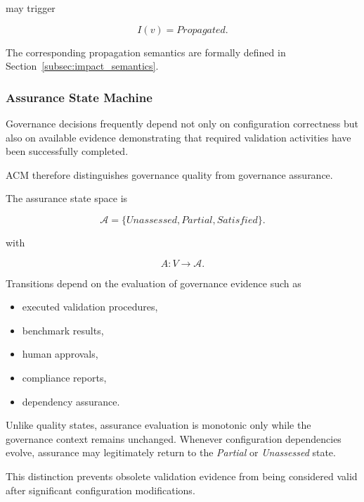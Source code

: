 \documentclass[10pt]{article}
\begin{document}
may trigger

\begin{equation}
I(v)=Propagated.
\label{eq:uv_propagation}
\end{equation}

The corresponding propagation semantics are formally defined in
Section~\ref{subsec:impact_semantics}.

\subsubsection{Assurance State Machine}

Governance decisions frequently depend not only on configuration correctness
but also on available evidence demonstrating that required validation
activities have been successfully completed.

ACM therefore distinguishes governance quality from governance assurance.

The assurance state space is

\begin{equation}
\mathcal{A}
=
\{
Unassessed,
Partial,
Satisfied
\}.
\label{eq:assurance_state}
\end{equation}

with

\begin{equation}
A
:
V
\rightarrow
\mathcal{A}.
\label{eq:assurance_state_function}
\end{equation}

Transitions depend on the evaluation of governance evidence such as

\begin{itemize}
    \item executed validation procedures,
    \item benchmark results,
    \item human approvals,
    \item compliance reports,
    \item dependency assurance.
\end{itemize}

Unlike quality states, assurance evaluation is monotonic only while the
governance context remains unchanged.
Whenever configuration dependencies evolve, assurance may legitimately return
to the \emph{Partial} or \emph{Unassessed} state.

This distinction prevents obsolete validation evidence from being considered
valid after significant configuration modifications.
\end{document}
